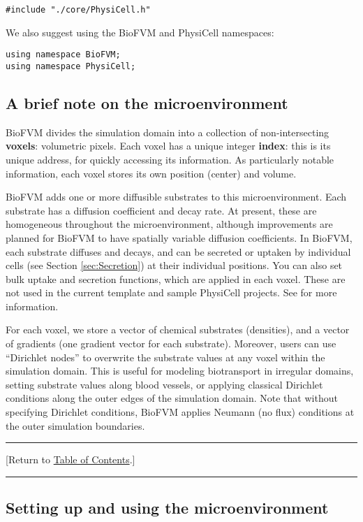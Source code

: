\documentclass[12pt]{article}
\renewcommand{\v}{\verb}
\newcommand{\TOClink}{\begin{center}\hrule\vskip-10pt\phantom{.}\hfill[Return to \hyperlink{TOC}{Table of Contents}.]\hfill\phantom{.}\vskip3pt\hrule\end{center}}
\begin{document}
\v|#include "./core/PhysiCell.h"|

We also suggest using the BioFVM and PhysiCell namespaces: 

\begin{verbatim}
using namespace BioFVM;
using namespace PhysiCell;
\end{verbatim}

\subsection{A brief note on the microenvironment}
\label{sec:about_BioFVM_microenvironment}
BioFVM divides the simulation domain into a collection of non-intersecting \textbf{voxels}: volumetric 
pixels. Each voxel has a unique integer \textbf{index}: this is its unique address, 
for quickly accessing its information. As particularly notable information, each 
voxel stores its own position (center) and volume. 

BioFVM adds one or more diffusible substrates to this microenvironment. Each substrate has a 
diffusion coefficient and decay rate. At present, these are homogeneous throughout the microenvironment, 
although improvements are planned for BioFVM to have spatially variable diffusion coefficients. In 
BioFVM, each substrate diffuses and decays, and can be secreted or uptaken by individual 
cells (see Section \ref{sec:Secretion}) at their individual positions. You can also set bulk uptake and secretion 
functions, which are applied in each voxel. These are not used in the current template and sample 
PhysiCell projects. See \cite{ref:BioFVM} for more information. 

For each voxel, we store a vector of chemical substrates (densities), and a vector of gradients (one 
gradient vector for each substrate). Moreover, users can use ``Dirichlet nodes'' to overwrite the 
substrate values at any voxel within the simulation domain. This is useful for modeling biotransport 
in irregular domains, setting substrate values along blood vessels, or applying classical Dirichlet conditions 
along the outer edges of the simulation domain. Note that without specifying Dirichlet conditions, 
BioFVM applies Neumann (no flux) conditions at the outer simulation boundaries. 

\TOClink 


\subsection{Setting up and using the microenvironment}
\label{sec:set_up_BioFVM}
\end{document}
